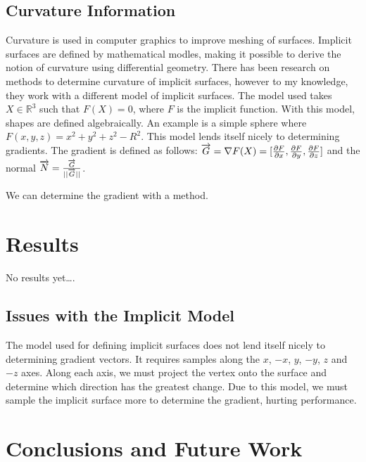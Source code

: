 \documentclass[conference]{acmsiggraph}
\begin{document}
\subsection{Curvature Information}
Curvature is used in computer graphics to improve meshing of surfaces. Implicit
surfaces are defined by mathematical modles, making it possible to derive the
notion of curvature using differential geometry. There has been research on
methods to determine curvature\cite{DeAraujo2004} of implicit surfaces, however
to my knowledge, they work with a different model of implicit surfaces. The
model used takes $X \in \mathbb{R}^3$ such that $F(X) = 0$, where $F$ is the
implicit function. With this model, shapes are defined algebraically. An
example is a simple sphere where $F(x, y, z) = x^2 + y ^ 2 + z ^2 - R^2$. This
model lends itself nicely to determining gradients. The gradient is defined as
follows: $\overrightarrow{G} = \nabla F(X) = [{\partial F\over\partial x},
{\partial F \over \partial y}, {\partial F \over \partial z}]$ and the normal
$\overrightarrow{N} = {\overrightarrow{G} \over ||\overrightarrow{G}||}$.

We can determine the gradient\cite{Stam2011} with a method.



\section{Results}
No results yet\ldots.

\subsection{Issues with the Implicit Model}
The model used for defining implicit surfaces does not lend itself nicely to
determining gradient vectors. It requires samples along the $x$, $-x$, $y$,
$-y$, $z$ and $-z$ axes. Along each axis, we must project the vertex onto
the surface and determine which direction has the greatest change. Due to this
model, we must sample the implicit surface more to determine the gradient,
hurting performance.


\section{Conclusions and Future Work}




\end{document}

